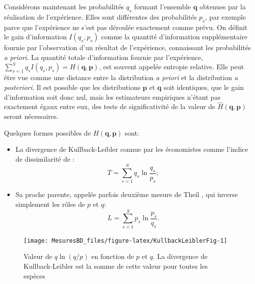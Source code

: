 \documentclass[
  11pt,
  french,
  a4paper,
  extrafontsizes,onecolumn,openright
  ]{memoir}
\providecommand{\tightlist}{%
  \setlength{\itemsep}{0pt}\setlength{\parskip}{0pt}}
\newlength{\rf}
\begin{document}
Considérons maintenant les probabilités \(q_s\) formant l'ensemble \(\mathbf{q}\) obtenues par la réalisation de l'expérience.
Elles sont différentes des probabilités \(p_s\), par exemple parce que l'expérience ne s'est pas déroulée exactement comme prévu.
On définit le gain d'information \(I(q_s,p_s)\) comme la quantité d'information supplémentaire fournie par l'observation d'un résultat de l'expérience, connaissant les probabilités \emph{a priori}.
La quantité totale d'information fournie par l'expérience, \(\sum^S_{s=1}{q_sI(q_s,p_s)}=H(\mathbf{q},\mathbf{p})\), est souvent appelée entropie relative.
Elle peut être vue comme une distance entre la distribution \emph{a priori} et la distribution \emph{a posteriori}.
Il est possible que les distributions \(\mathbf{p}\) et \(\mathbf{q}\) soit identiques, que le gain d'information soit donc nul, mais les estimateurs empiriques n'étant pas exactement égaux entre eux, des tests de significativité de la valeur de \(\hat{H}(\mathbf{q},\mathbf{p})\) seront nécessaires.

Quelques formes possibles de \(H(\mathbf{q},\mathbf{p})\) sont:

\begin{itemize}
\tightlist
\item
  La divergence de Kullback-Leibler \autocite{Kullback1951} connue par les économistes comme l'indice de dissimilarité de \textcite{Theil1967}:
  \begin{equation}
  \label{eq:Theil}
  T = \sum^S_{s=1}{q_{s}\ln\frac{q_s}{p_s}};
  \end{equation}
\item
  Sa proche parente, appelée parfois deuxième mesure de Theil \autocite{Conceicao2000}, qui inverse simplement les rôles de \(p\) et \(q\):
  \begin{equation}
  \label{eq:Theil2}
  L = \sum^S_{s=1}{p_{s}\ln\frac{p_s}{q_s}}.
  \end{equation}
\end{itemize}



\scriptsize

\begin{figure}

{\centering \texttt{[image: MesuresBD\_files/figure-latex/KullbackLeiblerFig-1]} 

}

\caption{Valeur de \(q\ln(q/p)\) en fonction de \(p\) et \(q\). La divergence de Kullback-Leibler est la somme de cette valeur pour toutes les espèces}\label{fig:KullbackLeiblerFig}
\end{figure}
\end{document}
